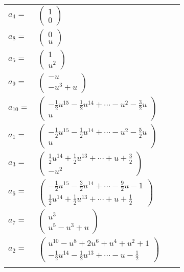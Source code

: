 \documentclass[1p]{elsarticle_modified}
\theoremstyle{definition}
\begin{document}
\begin{tabular}{m{7pt} m{180pt} m{7pt} m{180pt} }
\flushright $a_{4}=$&$\begin{pmatrix}1\\0\end{pmatrix}$ \\
\flushright $a_{8}=$&$\begin{pmatrix}0\\u\end{pmatrix}$ \\
\flushright $a_{5}=$&$\begin{pmatrix}1\\u^2\end{pmatrix}$ \\
\flushright $a_{9}=$&$\begin{pmatrix}- u\\- u^3+u\end{pmatrix}$ \\
\flushright $a_{10}=$&$\begin{pmatrix}-\frac{1}{2} u^{15}-\frac{1}{2} u^{14}+\cdots- u^2-\frac{3}{2} u\\u\end{pmatrix}$ \\
\flushright $a_{1}=$&$\begin{pmatrix}-\frac{1}{2} u^{15}-\frac{1}{2} u^{14}+\cdots- u^2-\frac{5}{2} u\\u\end{pmatrix}$ \\
\flushright $a_{3}=$&$\begin{pmatrix}\frac{1}{2} u^{14}+\frac{1}{2} u^{13}+\cdots+u+\frac{3}{2}\\- u^2\end{pmatrix}$ \\
\flushright $a_{6}=$&$\begin{pmatrix}-\frac{1}{2} u^{15}-\frac{3}{2} u^{14}+\cdots-\frac{9}{2} u-1\\\frac{1}{2} u^{14}+\frac{1}{2} u^{13}+\cdots+u+\frac{1}{2}\end{pmatrix}$ \\
\flushright $a_{7}=$&$\begin{pmatrix}u^3\\u^5- u^3+u\end{pmatrix}$ \\
\flushright $a_{2}=$&$\begin{pmatrix}u^{10}- u^8+2 u^6+u^4+u^2+1\\-\frac{1}{2} u^{14}-\frac{1}{2} u^{13}+\cdots- u-\frac{1}{2}\end{pmatrix}$\\&\end{tabular}
\end{document}
